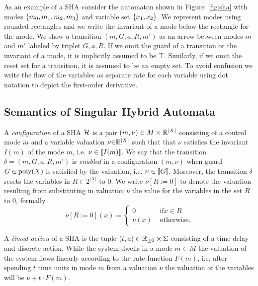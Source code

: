 

\begin{example}
  As an example of a SHA consider the automaton shown in Figure~\ref{fig:sha}
  with modes $\left\{ m_0, m_1, m_2, m_3 \right\}$ and variable set $\left\{ x_1, x_2 \right\}$. 
  We represent modes using rounded rectangles and we write the invariant of a
  mode below the rectangle for the mode. 
  We show a transition  $(m, G, a, R, m')$ as an arrow between modes $m$ and
  $m'$ labeled by triplet $G, a, R$. 
  If we omit the guard of a transition or the invariant of a mode, it is
  implicitly assumed to be $\top$.
  Similarly, if we omit the reset set for a transition, it is assumed to be an
  empty set.
  To avoid confusion we write the flow of the variables as separate rate for
  each variable using dot notation to depict the first-order derivative. 
\end{example}

\subsection{Semantics of Singular Hybrid Automata}

A \emph{configuration} of a SHA $\mathcal{H}$ is a pair $(m, \nu) \in M \times
\mathbb R^{|X|}$ consisting of a control  mode $m$ and a variable valuation $\nu {\in}
\mathbb R^{|X|}$ such that that $\nu$ satisfies the invariant $I(m)$ of the mode $m$,
i.e. $\nu \in [ \! [ {I(m)} ] \! ]$.   
We say that the transition $\delta = (m, G, a, R, m')$ is \emph{enabled} in a configuration $(m,
\nu)$ when guard $G \in \textrm{poly}(X)$ is satisfied by the valuation, i.e. $ \nu \in
[ \! [ {G} ] \! ]$.
Moreover, the transition $\delta$ resets the variables in $R \in 2^{|X|}$ to $0$.   
We write $\nu[R{:=}0]$ to denote the valuation resulting from
substituting in valuation $\nu$ the value for the variables in the set $R$ to
$0$, formally  
\[
\nu[R{:=}0](x) = 
	\begin{cases}
   		0 & \text{ if} x \in R\\
   		\nu(x) & \text{ otherwise.}
 	\end{cases}
 \]
 
 A \emph{timed action} of a SHA is the tuple $(t, a) \in \mathbb R_{\geq 0} \times \Sigma$
 consisting of a time delay and discrete action. 
 While the system dwells in a mode $m \in M$ the valuation of the system
 flows linearly according to the rate function $F(m)$, i.e.  after spending
 $t$ time units in mode $m$ from a valuation $\nu$ the valuation of the variables
 will be $\nu + t \cdot F(m)$.

